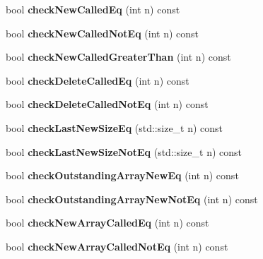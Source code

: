 \begin{DoxyCompactItemize}
bool {\bfseries check\+New\+Called\+Eq} (int n) const
\item 
\mbox{\label{class_mem_counter_a7f7fe5fcbb5b58e858470c8e18a7e15c}} 
bool {\bfseries check\+New\+Called\+Not\+Eq} (int n) const
\item 
\mbox{\label{class_mem_counter_adcaaf79481e8fd7123fa82df666fd659}} 
bool {\bfseries check\+New\+Called\+Greater\+Than} (int n) const
\item 
\mbox{\label{class_mem_counter_af1c24afc5ebafd99c0763a62efb59110}} 
bool {\bfseries check\+Delete\+Called\+Eq} (int n) const
\item 
\mbox{\label{class_mem_counter_a9d322ad7470eb010768b22e6a2f621da}} 
bool {\bfseries check\+Delete\+Called\+Not\+Eq} (int n) const
\item 
\mbox{\label{class_mem_counter_ad32102c85db606f9b470866dc9ad472e}} 
bool {\bfseries check\+Last\+New\+Size\+Eq} (std\+::size\+\_\+t n) const
\item 
\mbox{\label{class_mem_counter_a3d030caeeffb8e3846543ac0eff99291}} 
bool {\bfseries check\+Last\+New\+Size\+Not\+Eq} (std\+::size\+\_\+t n) const
\item 
\mbox{\label{class_mem_counter_a13cfd64603676c3eede396705aeb9b47}} 
bool {\bfseries check\+Outstanding\+Array\+New\+Eq} (int n) const
\item 
\mbox{\label{class_mem_counter_a5d521182be50c1ffedfc39a363e44d78}} 
bool {\bfseries check\+Outstanding\+Array\+New\+Not\+Eq} (int n) const
\item 
\mbox{\label{class_mem_counter_a1f0dfe6745831b34100fc57967c8562c}} 
bool {\bfseries check\+New\+Array\+Called\+Eq} (int n) const
\item 
\mbox{\label{class_mem_counter_aab99bdcacd6e8ac7265ac62b3910344c}} 
bool {\bfseries check\+New\+Array\+Called\+Not\+Eq} (int n) const
\item 
\mbox{\label{class_mem_counter_a4cbbeea88069a3e156a7207175daa377}} 

\end{DoxyCompactItemize}
